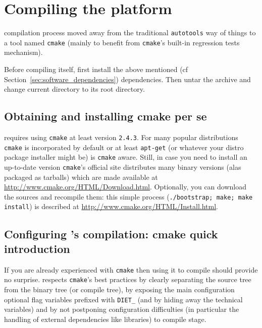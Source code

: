 \section{Compiling the platform}
\label{sec:compil_platform}

\diet compilation process moved away from the traditional \verb+autotools+ way
of things to a tool named \verb+cmake+ (mainly to benefit from \verb+cmake+'s
built-in regression tests mechanism).

Before compiling \diet itself, first install the above mentioned (cf
Section~\ref{sec:software_dependencies}) dependencies.  Then untar the \diet
archive and change current directory to its root directory.

\subsection{Obtaining and installing cmake per se}
\diet requires using \verb+cmake+ at least version \verb+2.4.3+. For
many popular distributions \verb+cmake+ is incorporated by default or
at least \verb+apt-get+ (or whatever your distro package installer
might be) is \verb+cmake+ aware. Still, in case you need to install
an up-to-date version \verb+cmake+'s official site distributes many
binary versions (alas packaged as tarballs) which are made available
at \url{http://www.cmake.org/HTML/Download.html}. Optionally, you
can download the sources and recompile them: this simple process
(\verb+./bootstrap; make; make install+) is described at
\url{http://www.cmake.org/HTML/Install.html}.

\subsection{Configuring \diet's compilation: cmake quick introduction}
If you are already experienced with \verb+cmake+ then using it to
compile \diet should provide no surprise. \diet respects
\verb+cmake+'s best practices \eg by clearly separating the source
tree from the binary tree (or compile tree), by exposing the main
configuration optional flag variables prefixed with \verb+DIET_+ (and
by hiding away the technical variables) and by not postponing
configuration difficulties (in particular the handling of external
dependencies like libraries) to compile stage.

